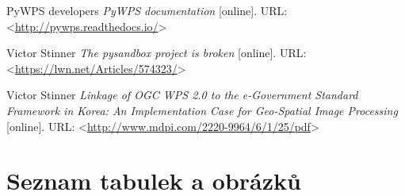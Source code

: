 \documentclass[12pt,a4paper]{article}
\begin{document}
\begin{thebibliography}{99}
PyWPS developers \textit{PyWPS documentation} [online].
URL: \textless\url{http://pywps.readthedocs.io/}\textgreater

Victor Stinner \textit{The pysandbox project is broken} [online].
URL: \textless\url{https://lwn.net/Articles/574323/}\textgreater

Victor Stinner \textit{Linkage of OGC WPS 2.0 to the e-Government Standard Framework in Korea: An Implementation Case for Geo-Spatial Image Processing} [online].
URL: \textless\url{http://www.mdpi.com/2220-9964/6/1/25/pdf}\textgreater

\end{thebibliography}

\newpage
\section{Seznam tabulek a obrázků}
\listoftables

\listoffigures
\end{document}
